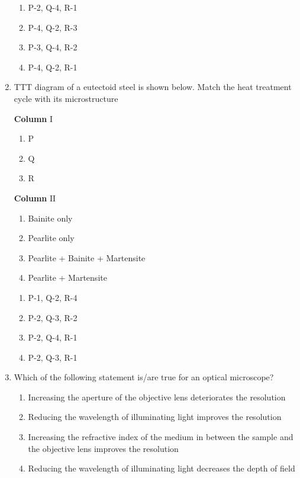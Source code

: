 \documentclass[journal]{IEEEtran}
\numberwithin{equation}{enumi}
\numberwithin{figure}{enumi}
\begin{document}
\begin{enumerate}
		\begin{enumerate}
			\item P-2, Q-4, R-1
			\item P-4, Q-2, R-3
			\item P-3, Q-4, R-2
			\item P-4, Q-2, R-1
		\end{enumerate}

	\item TTT diagram of a eutectoid steel is shown below. Match the heat treatment cycle  with its microstructure 


		\begin{multicols}{2}
			\textbf{Column} $\mathrm{I}$
			\begin{enumerate}
				\item P
				\item Q
				\item R
			\end{enumerate}
			\columnbreak
                        \textbf{Column} $\mathrm{II}$
			\begin{enumerate}
				\item[1] Bainite only
				\item[2] Pearlite only
				\item[3] Pearlite + Bainite + Martensite
				\item[4] Pearlite + Martensite
			\end{enumerate}
		\end{multicols}

		\begin{enumerate}
			\item P-1, Q-2, R-4
			\item P-2, Q-3, R-2
			\item P-2, Q-4, R-1
			\item P-2, Q-3, R-1
		\end{enumerate}

	\item Which of the following statement is/are true for an optical microscope?
		
		\begin{enumerate}
			\item Increasing the aperture of the objective lens deteriorates the resolution
			\item Reducing the wavelength of illuminating light improves the resolution
			\item Increasing the refractive index of the medium in between the sample and the objective lens improves the resolution
			\item Reducing the wavelength of illuminating light decreases the depth of field
		\end{enumerate}


\end{enumerate}
\end{document}
